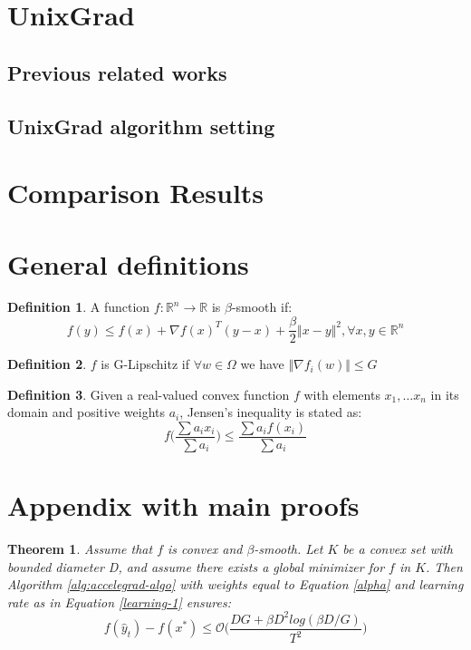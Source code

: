 \documentclass[12pt]{article}
\newtheorem{theorem}{Theorem}
\theoremstyle{definition}
\newtheorem{definition}{Definition}[section]
\begin{document}
\section{UnixGrad}
\subsection{Previous related works}
\subsection{UnixGrad algorithm setting}
\section{Comparison Results}

\section{General definitions}


\begin{definition}
	A function $f: \mathbb{R}^n \rightarrow \mathbb{R}$ is $\beta$-smooth if:
	$$
		f(y) \leq f(x) + \nabla f(x)^T(y-x) + \frac{\beta}{2} \Vert x-y \Vert^2, \forall x,y \in \mathbb{R}^n
	$$
\label{b-smooth}
\end{definition}

\begin{definition}
	$f$ is G-Lipschitz if $\forall w \in \Omega$ we have $\Vert \nabla f_i(w) \Vert \leq G$
\label{g-lipschitz}
\end{definition}

\begin{definition}
	Given a real-valued convex function $f$ with elements $x_1, \dots x_n$ in its domain and positive weights $a_i$, Jensen's inequality is stated as:
	$$
		f\bigg(\frac{\sum a_i x_i }{\sum a_i}\bigg) \leq \frac{\sum a_i f(x_i)}{\sum a_i}
	$$
\label{jensen}
\end{definition}





\section{Appendix with main proofs}

\begin{theorem}
Assume that $f$ is convex and $\beta$-smooth. Let $K$ be a convex set with bounded diameter D, and assume there exists a global minimizer for $f$ in $K$. Then Algorithm \ref{alg:accelegrad-algo} with weights equal to Equation \ref{alpha} and learning rate as in Equation \ref{learning-1} ensures:
$$
f(\hat y_t) - f(x^*) \leq \mathcal{O} \bigg (\frac{DG + \beta D^2 log(\beta D / G)}{T^2}\bigg)
$$
\label{Theorem-1-acc}
\end{theorem}
\end{document}
